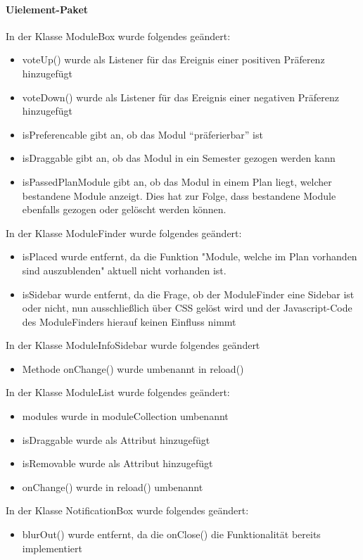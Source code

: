 \paragraph{Uielement-Paket}
In der Klasse ModuleBox wurde folgendes geändert:
\begin{itemize}
	\item voteUp() wurde als Listener für das Ereignis einer positiven Präferenz hinzugefügt
	\item voteDown() wurde als Listener für das Ereignis einer negativen Präferenz hinzugefügt
	\item isPreferencable gibt an, ob das Modul \enquote{präferierbar} ist
	\item isDraggable gibt an, ob das Modul in ein Semester gezogen werden kann
	\item isPassedPlanModule gibt an, ob das Modul in einem Plan liegt, welcher bestandene Module anzeigt. Dies hat zur Folge, dass bestandene Module ebenfalls gezogen oder gelöscht werden können.
\end{itemize}
In der Klasse ModuleFinder wurde folgendes geändert:
\begin{itemize}
	\item isPlaced wurde entfernt, da die Funktion "Module, welche im Plan vorhanden sind auszublenden" aktuell nicht vorhanden ist.
	\item isSidebar wurde entfernt, da die Frage, ob der ModuleFinder eine Sidebar ist oder nicht, nun ausschließlich über CSS gelöst wird und der Javascript-Code des ModuleFinders hierauf keinen Einfluss nimmt
\end{itemize}
In der Klasse ModuleInfoSidebar wurde folgendes geändert
\begin{itemize}
	\item Methode onChange() wurde umbenannt in reload()
\end{itemize}
In der Klasse ModuleList wurde folgendes geändert:
\begin{itemize}
	\item modules wurde in moduleCollection umbenannt
	\item isDraggable wurde als Attribut hinzugefügt
	\item isRemovable wurde als Attribut hinzugefügt
	\item onChange() wurde in reload() umbenannt
\end{itemize}
In der Klasse NotificationBox wurde folgendes geändert:
\begin{itemize}
	\item blurOut() wurde entfernt, da die onClose() die Funktionalität bereits implementiert
\end{itemize}
